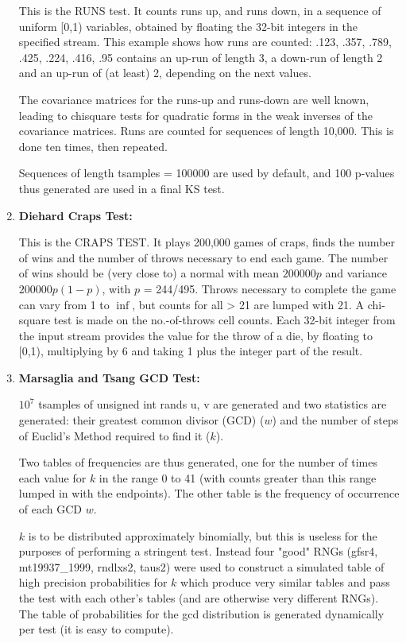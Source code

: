 \documentclass[titlepage, 11pt]{article}
\begin{document}
\begin{enumerate}
This is the RUNS test.  It counts runs up, and runs down, 
in a sequence of uniform [0,1) variables, obtained by floating the 32-bit integers in the specified stream. This example   
shows how runs are counted: .123, .357, .789, .425, .224, .416, .95 contains an up-run of length 3, a down-run of length 2 and an up-run of (at least) 2, depending on the next values.


The covariance matrices for the runs-up and runs-down are well known, leading to chisquare tests for quadratic forms in the  
weak inverses of the covariance matrices.  Runs are counted   
for sequences of length 10,000.  This is done ten times, then repeated.                                                     

Sequences of length tsamples = 100000 are used by default, and 100 p-values thus generated are used in a final
KS test.


\item {\textbf{Diehard Craps Test:}}


This is the CRAPS TEST. It plays 200,000 games of craps, finds  
the number of wins and the number of throws necessary to end    
each game.  The number of wins should be (very close to) a      
normal with mean $200000p$ and variance $200000p(1-p)$, with        
$p$ = 244/495.  Throws necessary to complete the game can vary      
from 1 to $\inf$, but counts for all > 21 are lumped with 21.   
A chi-square test is made on the no.-of-throws cell counts.     
Each 32-bit integer from the input stream provides the value for   
the throw of a die, by floating to [0,1), multiplying by 6      
and taking 1 plus the integer part of the result.


\item \textbf{Marsaglia and Tsang GCD Test:}


$10^7$ tsamples of unsigned int rands u, v are generated and two
statistics are generated: their greatest common divisor (GCD) ($w$)
and the number of steps of Euclid's Method required to find it
($k$).  


Two tables of frequencies are thus generated, one for the
number of times each value for $k$ in the range 0 to 41 (with counts
greater than this range lumped in with the endpoints).
The other table is the frequency of occurrence of each GCD $w$.



$k$ is to be distributed approximately binomially, but this is useless for
the purposes of performing a stringent test.  Instead four "good"
RNGs (gfsr4, mt19937\_1999, rndlxs2, taus2) were used to construct a
simulated table of high precision probabilities for $k$ which produce very similar tables
and pass the test with each other's tables (and are otherwise very
different RNGs).  The table of probabilities for the gcd distribution is
generated dynamically per test (it is easy to compute).




\end{enumerate}
\end{document}
